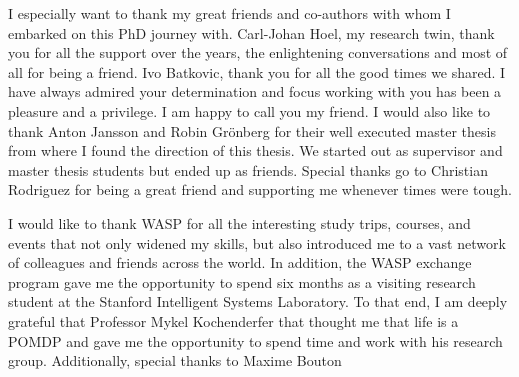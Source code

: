 I especially want to thank my great friends and co-authors with whom I embarked on this PhD journey with. Carl-Johan Hoel, my research twin, thank you for all the support over the years, the enlightening conversations and most of all for being a friend. %
Ivo Batkovic, thank you for all the good times we shared. I have always admired your determination and focus working with you has been a pleasure and a privilege. I am happy to call you my friend. 
I would also like to thank Anton Jansson and Robin Gr\"onberg for their well executed master thesis from where I found the direction of this thesis. We started out as supervisor and master thesis students but ended up as friends. 
Special thanks go to Christian Rodriguez for being a great friend and supporting me whenever times were tough.

I would like to thank WASP for all the interesting study trips, courses, and events that not only widened my skills, but also introduced me to a vast network of colleagues and friends across the world. In addition, the WASP exchange program gave me the opportunity to spend six months as a visiting research student at the Stanford Intelligent Systems Laboratory. To that end, I am deeply grateful that Professor Mykel Kochenderfer that thought me that life is a POMDP and gave me the opportunity to spend time and work with his research group. 
Additionally, special thanks to Maxime Bouton 



